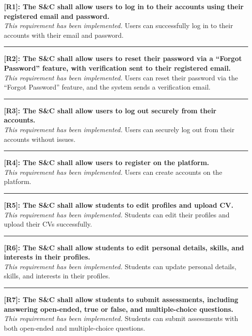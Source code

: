 \noindent\textbf{[R1]: The S\&C shall allow users to log in to their accounts using their registered email and password.} \\
\textit{This requirement has been implemented.} Users can successfully log in to their accounts with their email and password.

\noindent\rule{16cm}{0.4pt}

\noindent\textbf{[R2]: The S\&C shall allow users to reset their password via a “Forgot Password” feature, with verification sent to their registered email.} \\
\textit{This requirement has been implemented.} Users can reset their password via the “Forgot Password” feature, and the system sends a verification email.

\noindent\rule{16cm}{0.4pt}

\noindent\textbf{[R3]: The S\&C shall allow users to log out securely from their accounts.} \\
\textit{This requirement has been implemented.} Users can securely log out from their accounts without issues.

\noindent\rule{16cm}{0.4pt}

\noindent\textbf{[R4]: The S\&C shall allow users to register on the platform.} \\
\textit{This requirement has been implemented.} Users can create accounts on the platform.

\noindent\rule{16cm}{0.4pt}

\noindent\textbf{[R5]: The S\&C shall allow students to edit profiles and upload CV.} \\
\textit{This requirement has been implemented.} Students can edit their profiles and upload their CVs successfully.

\noindent\rule{16cm}{0.4pt}

\noindent\textbf{[R6]: The S\&C shall allow students to edit personal details, skills, and interests in their profiles.} \\
\textit{This requirement has been implemented.} Students can update personal details, skills, and interests in their profiles.

\noindent\rule{16cm}{0.4pt}

\noindent\textbf{[R7]: The S\&C shall allow students to submit assessments, including answering open-ended, true or false, and multiple-choice questions.} \\
\textit{This requirement has been implemented.} Students can submit assessments with both open-ended and multiple-choice questions.

